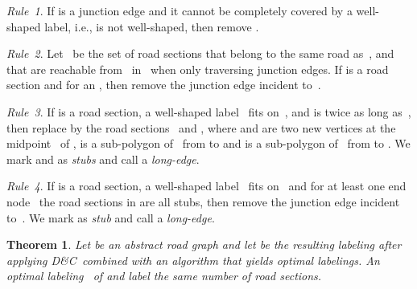 \documentclass[a4paper,11pt]{article}
\newtheorem{theorem}{Theorem}
\newcommand{\RuleA}{\textit{Rule~1}\xspace}
\newcommand{\RuleB}{\textit{Rule~2}\xspace}
\newcommand{\RuleC}{\textit{Rule~3}\xspace}
\newcommand{\RuleD}{\textit{Rule~4}\xspace}
\newcommand{\Shredder}{\textsc{D\&C}}
\begin{document}
\RuleA. If  is a junction edge and it cannot be completely covered
by a well-shaped label, i.e.,  is not well-shaped, then remove .

\RuleB. Let~ be the set of road sections that belong to the
same road as~, and that are reachable from~ in~ when only
traversing junction edges. If  is a road section and
 for an , then remove the junction edge incident
to~.

\RuleC. If  is a road section, a well-shaped label~
fits on~, and  is twice as long as~, then replace  by
the road sections~ and , where  and
 are two new vertices at the midpoint~ of ,  is a sub-polygon of~ from
 to  and  is a sub-polygon of~ from  to . We
mark  and  as \emph{stubs} and call  a \emph{long-edge}.

\RuleD.  If  is a road section, a well-shaped label~
fits on~ and for at least one end node~ the road
sections in  are all stubs, then remove the
junction edge incident to~. We mark  as \emph{stub} and call 
a \emph{long-edge}.


\newcommand{\thmRules}{Let  be an
  abstract road graph and let  be the resulting labeling
  after applying \Shredder\ combined with an algorithm that yields optimal labelings. An optimal labeling~ of  and  label the same number of road sections.  }

\begin{theorem}\label{apx:thm:rules}
\thmRules
\end{theorem}
\end{document}

